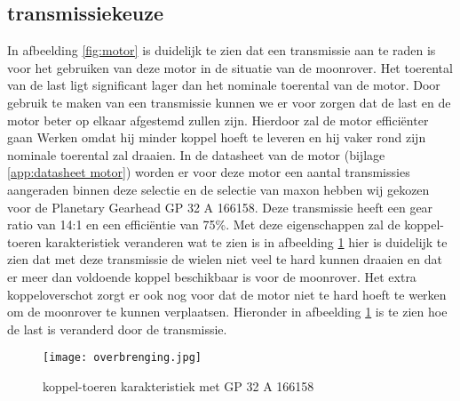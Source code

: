 \newpage

\subsection{transmissiekeuze}
In afbeelding \ref{fig:motor} is duidelijk te zien dat een transmissie aan te raden is voor het gebruiken van deze motor in de situatie van de moonrover. Het toerental van de last ligt significant lager dan het nominale toerental van de motor. Door gebruik te maken van een transmissie kunnen we er voor zorgen dat de last en de motor beter op elkaar afgestemd zullen zijn. Hierdoor zal de motor efficiënter gaan Werken omdat hij minder koppel hoeft te leveren en hij vaker rond zijn nominale toerental zal draaien. In de datasheet van de  motor (bijlage \ref{app:datasheet motor}) worden er voor deze motor een aantal transmissies aangeraden binnen deze selectie en de selectie van maxon hebben wij gekozen voor de Planetary Gearhead GP 32 A 166158. Deze transmissie heeft een gear ratio van 14:1 en een efficiëntie van 75\%. Met deze eigenschappen zal de koppel-toeren karakteristiek veranderen wat te zien is in afbeelding \ref{fig:GP 32 A 166158} hier is duidelijk te zien dat met deze transmissie de wielen niet veel te hard kunnen draaien en dat er meer dan voldoende koppel beschikbaar is voor de moonrover. Het extra koppeloverschot zorgt er ook nog voor dat de motor niet te hard hoeft te werken om de moonrover te kunnen verplaatsen. Hieronder in afbeelding \ref{fig:GP 32 A 166158} is te zien hoe de last is veranderd door de transmissie.

        \begin{figure}[H]
                \centering
                \texttt{[image: overbrenging.jpg]}
                \caption{koppel-toeren karakteristiek met GP 32 A 166158}
                \label{fig:GP 32 A 166158}
        \end{figure}

